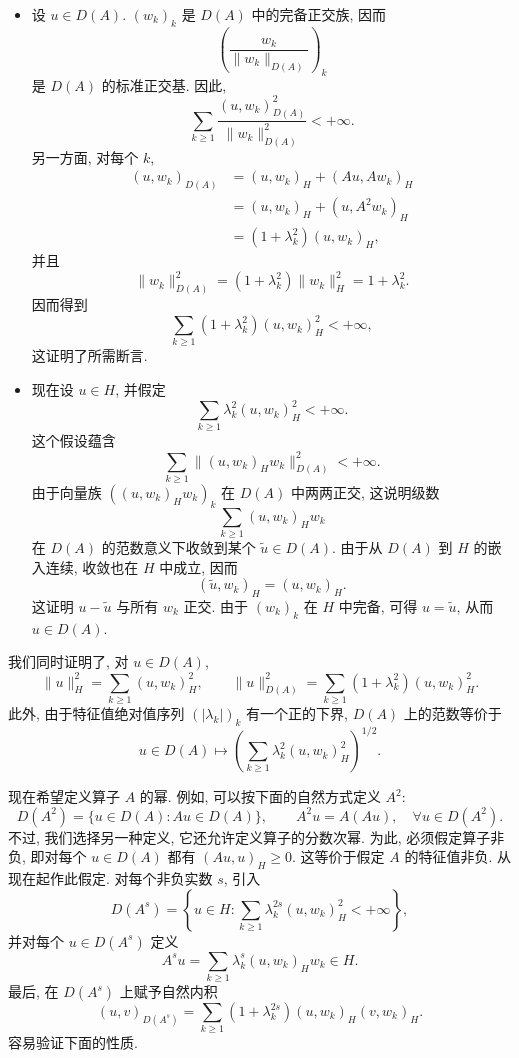 \begin{Proof}
\begin{itemize}
 \item 设 $u\in D(A)$. $(w_k)_k$ 是 $D(A)$ 中的完备正交族, 因而
 \[
  \left(\frac{w_k}{\|w_k\|_{D(A)}}\right)_k
 \]
 是 $D(A)$ 的标准正交基. 因此,
 \[
  \sum_{k\geq1}\frac{(u,w_k)_{D(A)}^2}{\|w_k\|_{D(A)}^2}<+\infty.
 \]
 另一方面, 对每个 $k$,
 \[
 \begin{aligned}
 (u,w_k)_{D(A)}
 &= (u,w_k)_H+(Au,Aw_k)_H\\
 &= (u,w_k)_H+(u,A^2w_k)_H\\
 &= (1+\lambda_k^2)(u,w_k)_H,
 \end{aligned}
 \]
 并且
 \[
  \|w_k\|_{D(A)}^2=(1+\lambda_k^2)\|w_k\|_H^2=1+\lambda_k^2.
 \]
 因而得到
 \[
  \sum_{k\geq1}(1+\lambda_k^2)(u,w_k)_H^2<+\infty,
 \]
 这证明了所需断言.

 \item 现在设 $u\in H$, 并假定
 \[
  \sum_{k\geq1}\lambda_k^2(u,w_k)_H^2<+\infty.
 \]
 这个假设蕴含
 \[
  \sum_{k\geq1}\|(u,w_k)_Hw_k\|_{D(A)}^2<+\infty.
 \]
 由于向量族 $((u,w_k)_Hw_k)_k$ 在 $D(A)$ 中两两正交, 这说明级数
 \[
  \sum_{k\geq1}(u,w_k)_Hw_k
 \]
 在 $D(A)$ 的范数意义下收敛到某个 $\widetilde u\in D(A)$. 由于从 $D(A)$ 到 $H$ 的嵌入连续, 收敛也在 $H$ 中成立, 因而
 \[
  (\widetilde u,w_k)_H=(u,w_k)_H.
 \]
 这证明 $u-\widetilde u$ 与所有 $w_k$ 正交. 由于 $(w_k)_k$ 在 $H$ 中完备, 可得 $u=\widetilde u$, 从而 $u\in D(A)$.
\end{itemize}
\end{Proof}

我们同时证明了, 对 $u\in D(A)$,
\[
 \|u\|_H^2=\sum_{k\geq1}(u,w_k)_H^2,
 \qquad
 \|u\|_{D(A)}^2=\sum_{k\geq1}(1+\lambda_k^2)(u,w_k)_H^2.
\]
此外, 由于特征值绝对值序列 $(|\lambda_k|)_k$ 有一个正的下界, $D(A)$ 上的范数等价于
\[
 u\in D(A)\longmapsto
 \left(\sum_{k\geq1}\lambda_k^2(u,w_k)_H^2\right)^{1/2}.
\]

现在希望定义算子 $A$ 的幂. 例如, 可以按下面的自然方式定义 $A^2$:
\[
 D(A^2)=\{u\in D(A):Au\in D(A)\},
 \qquad A^2u=A(Au),\quad\forall u\in D(A^2).
\]
不过, 我们选择另一种定义, 它还允许定义算子的分数次幂. 为此, 必须假定算子非负, 即对每个 $u\in D(A)$ 都有 $(Au,u)_H\geq0$. 这等价于假定 $A$ 的特征值非负. 从现在起作此假定. 对每个非负实数 $s$, 引入
\[
 D(A^s)=\left\{u\in H:\sum_{k\geq1}\lambda_k^{2s}(u,w_k)_H^2<+\infty\right\},
\]
并对每个 $u\in D(A^s)$ 定义
\[
 A^su=\sum_{k\geq1}\lambda_k^s(u,w_k)_Hw_k\in H.
\]
最后, 在 $D(A^s)$ 上赋予自然内积
\[
 (u,v)_{D(A^s)}=\sum_{k\geq1}(1+\lambda_k^{2s})(u,w_k)_H(v,w_k)_H.
\]
容易验证下面的性质.


